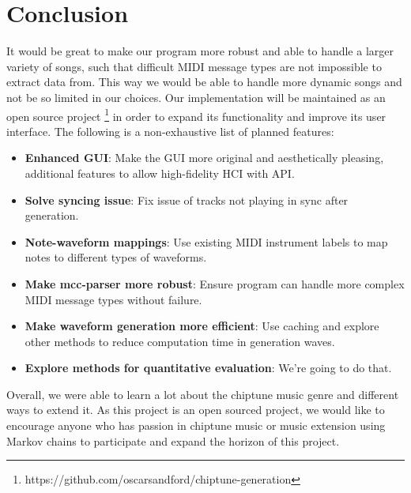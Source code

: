 \documentclass{article}
\begin{document}
\section{Conclusion} 
It would be great to make our program more robust and able to handle a larger variety of songs, such that difficult MIDI message types are not impossible to extract
data from. This way we would be able to handle more dynamic songs and not be so limited in our choices. Our implementation will be maintained as an open source 
project \footnote{https://github.com/oscarsandford/chiptune-generation} in order to expand its functionality and improve its user interface. The following is a non-exhaustive 
list of planned features:
\begin{itemize}
  \item \textbf{Enhanced GUI}: Make the GUI more original and aesthetically pleasing, additional features to allow high-fidelity HCI with API.
  \item \textbf{Solve syncing issue}: Fix issue of tracks not playing in sync after generation.
  \item \textbf{Note-waveform mappings}: Use existing MIDI instrument labels to map notes to different types of waveforms.
  \item \textbf{Make mcc-parser more robust}: Ensure program can handle more complex MIDI message types without failure.
  \item \textbf{Make waveform generation more efficient}: Use caching and explore other methods to reduce computation time in generation waves.
  \item \textbf{Explore methods for quantitative evaluation}: We're going to do that.
\end{itemize}
Overall, we were able to learn a lot about the chiptune music genre and different ways to extend it. As this project is an open sourced project, we would like to encourage
anyone who has passion in chiptune music or music extension using Markov chains to participate and expand the horizon of this project.


\end{document}

